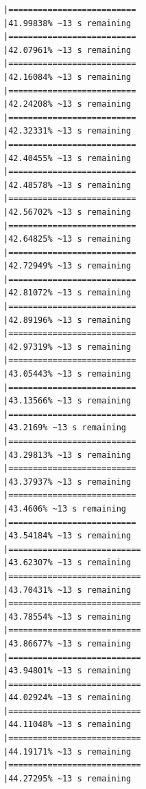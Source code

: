 \documentclass{article}\usepackage[]{graphicx}\usepackage[]{xcolor}
\makeatletter
\newenvironment{kframe}{%
 \def\at@end@of@kframe{}%
 \ifinner\ifhmode%
  \def\at@end@of@kframe{\end{minipage}}%
  \begin{minipage}{\columnwidth}%
 \fi\fi%
 \def\FrameCommand##1{\hskip\@totalleftmargin \hskip-\fboxsep
 \colorbox{shadecolor}{##1}\hskip-\fboxsep
     \hskip-\linewidth \hskip-\@totalleftmargin \hskip\columnwidth}%
 \MakeFramed {\advance\hsize-\width
   \@totalleftmargin\z@ \linewidth\hsize
   \@setminipage}}%
 {\par\unskip\endMakeFramed%
 \at@end@of@kframe}
\newenvironment{knitrout}{}{} %
\makeatother
\begin{document}
\begin{knitrout}
\begin{kframe}
\begin{verbatim}
|==========================                                    |41.99838% ~13 s remaining 
|==========================                                    |42.07961% ~13 s remaining 
|==========================                                    |42.16084% ~13 s remaining 
|==========================                                    |42.24208% ~13 s remaining 
|==========================                                    |42.32331% ~13 s remaining 
|==========================                                    |42.40455% ~13 s remaining 
|==========================                                    |42.48578% ~13 s remaining 
|==========================                                    |42.56702% ~13 s remaining 
|==========================                                    |42.64825% ~13 s remaining 
|==========================                                    |42.72949% ~13 s remaining 
|==========================                                    |42.81072% ~13 s remaining 
|==========================                                    |42.89196% ~13 s remaining 
|==========================                                    |42.97319% ~13 s remaining 
|==========================                                    |43.05443% ~13 s remaining 
|==========================                                    |43.13566% ~13 s remaining 
|==========================                                    |43.2169% ~13 s remaining  
|==========================                                    |43.29813% ~13 s remaining 
|==========================                                    |43.37937% ~13 s remaining 
|==========================                                    |43.4606% ~13 s remaining  
|==========================                                    |43.54184% ~13 s remaining 
|===========================                                   |43.62307% ~13 s remaining 
|===========================                                   |43.70431% ~13 s remaining 
|===========================                                   |43.78554% ~13 s remaining 
|===========================                                   |43.86677% ~13 s remaining 
|===========================                                   |43.94801% ~13 s remaining 
|===========================                                   |44.02924% ~13 s remaining 
|===========================                                   |44.11048% ~13 s remaining 
|===========================                                   |44.19171% ~13 s remaining 
|===========================                                   |44.27295% ~13 s remaining 

\end{verbatim}
\end{kframe}
\end{knitrout}
\end{document}
